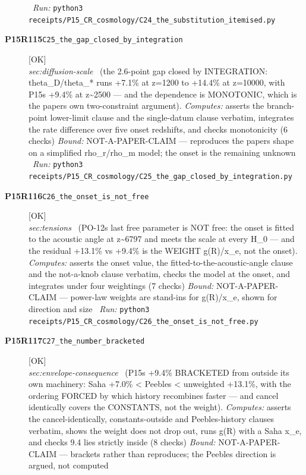 \begin{description}
\ \emph{Run:} \texttt{python3 receipts/P15\_CR\_cosmology/C24\_the\_substitution\_itemised.py}
\item[\rcptlabel{C25_the_gap_closed_by_integration}{P15R115}\textbf{P15R115}\quad\texttt{C25\_the\_gap\_closed\_by\_integration}]\hfill\textsf{[OK]}\\
\textit{sec:diffusion-scale} \ (the 2.6-point gap closed by INTEGRATION: theta\_D/theta\_* runs +7.1\% at z=1200 to +14.4\% at z=10000, with P15s +9.4\% at z\textasciitilde{}2500 --- and the dependence is MONOTONIC, which is the papers own two-constraint argument). 
\emph{Computes:} asserts the branch-point lower-limit clause and the single-datum clause verbatim, integrates the rate difference over five onset redshifts, and checks monotonicity (6 checks)
 \emph{Bound:} NOT-A-PAPER-CLAIM --- reproduces the papers shape on a simplified rho\_r/rho\_m model; the onset is the remaining unknown
\ \emph{Run:} \texttt{python3 receipts/P15\_CR\_cosmology/C25\_the\_gap\_closed\_by\_integration.py}
\item[\rcptlabel{C26_the_onset_is_not_free}{P15R116}\textbf{P15R116}\quad\texttt{C26\_the\_onset\_is\_not\_free}]\hfill\textsf{[OK]}\\
\textit{sec:tensions} \ (PO-12s last free parameter is NOT free: the onset is fitted to the acoustic angle at z\textasciitilde{}6797 and meets the scale at every H\_0 --- and the residual +13.1\% vs +9.4\% is the WEIGHT g(R)/x\_e, not the onset). 
\emph{Computes:} asserts the onset value, the fitted-to-the-acoustic-angle clause and the not-a-knob clause verbatim, checks the model at the onset, and integrates under four weightings (7 checks)
 \emph{Bound:} NOT-A-PAPER-CLAIM --- power-law weights are stand-ins for g(R)/x\_e, shown for direction and size
\ \emph{Run:} \texttt{python3 receipts/P15\_CR\_cosmology/C26\_the\_onset\_is\_not\_free.py}
\item[\rcptlabel{C27_the_number_bracketed}{P15R117}\textbf{P15R117}\quad\texttt{C27\_the\_number\_bracketed}]\hfill\textsf{[OK]}\\
\textit{sec:envelope-consequence} \ (P15s +9.4\% BRACKETED from outside its own machinery: Saha +7.0\% < Peebles < unweighted +13.1\%, with the ordering FORCED by which history recombines faster --- and cancel identically covers the CONSTANTS, not the weight). 
\emph{Computes:} asserts the cancel-identically, constants-outside and Peebles-history clauses verbatim, shows the weight does not drop out, runs g(R) with a Saha x\_e, and checks 9.4 lies strictly inside (8 checks)
 \emph{Bound:} NOT-A-PAPER-CLAIM --- brackets rather than reproduces; the Peebles direction is argued, not computed

\end{description}
